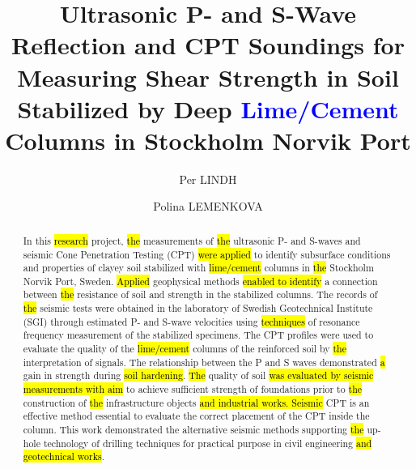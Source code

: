 \documentclass[final,3p,times,onecolumn,authoryear]{elsarticle}
\begin{document}
\begin{frontmatter}

\title{\textbf{Ultrasonic P- and S-Wave Reflection and CPT Soundings for Measuring Shear Strength in Soil Stabilized by Deep \textcolor{blue}{Lime/Cement} Columns in Stockholm Norvik Port}}

\author[label1,label2]{Per LINDH}


\author[label3]{Polina LEMENKOVA}

\begin{abstract} In this \hl{research }project, \hl{the }measurements of \hl{the }ultrasonic P- and S-waves and seismic Cone Penetration Testing (CPT) \hl{were applied} to identify subsurface conditions and properties of clayey soil stabilized with \hl{lime/cement} columns in \hl{the }Stockholm Norvik Port, Sweden. \hl{Applied} geophysical methods \hl{enabled to identify} a connection between \hl{the }resistance of soil and strength in the stabilized columns. The records of \hl{the }seismic tests were obtained in the laboratory of Swedish Geotechnical Institute (SGI) through estimated\hl{ }P- and S-wave velocities using \hl{techniques} of resonance frequency measurement of the stabilized\hl{ }specimens. The CPT profiles were used to evaluate the quality of the \hl{lime/cement} columns of the reinforced soil by \hl{the }interpretation of signals. The relationship between the P and S waves demonstrated \hl{a} gain in strength during \hl{soil hardening}. \hl{The} quality of soil \hl{was evaluated by seismic measurements with aim }to achieve sufficient strength of foundations prior to \hl{the }construction of \hl{the }infrastructure objects \hl{and industrial works. Seismic} CPT is an effective method essential to evaluate the correct placement of the CPT inside the column. This work demonstrated the\hl{ }alternative seismic methods supporting \hl{the }up-hole technology of drilling techniques for practical purpose in civil\hl{ }engineering \hl{and geotechnical works}. 
\end{abstract}


\end{frontmatter}
\end{document}
